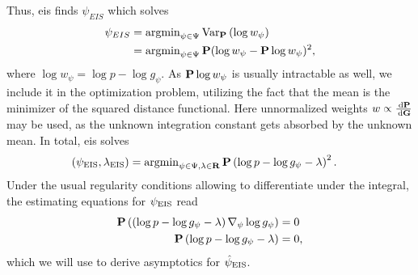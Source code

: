 Thus, \gls{eis} finds $\psi_{EIS}$ which solves 
\begin{align*}
\psi_{EIS} &= \argmin_{\psi \in\Psi} \text{Var}_{\P} \left( \log w_{\psi} \right) \\
    &= \argmin_{\psi \in \Psi} \P (\log w_{\psi} - \P \log w_{\psi})^{2},
\end{align*}
where $\log w_{\psi} = \log p - \log g_{\psi}$.
As $\P \log w_{\psi}$ is usually intractable as well, we include it in the optimization problem, utilizing the fact that the mean is the minimizer of the squared distance functional.
Here unnormalized weights $w \propto \frac{\d\P}{\d\G}$ may be used, as the unknown integration constant gets absorbed by the unknown mean. In total, \gls{eis} solves
\begin{align*}
\left(\psi_{\text{EIS}}, \lambda_{\text{EIS}}\right) &= \argmin_{\psi \in\Psi, \lambda \in \mathbf R} \P \left( \log p - \log g_{\psi} - \lambda \right)^{2}.
\end{align*}
Under the usual regularity conditions allowing to differentiate under the integral, the estimating equations for $\peis$ read
\begin{align}
    \label{eq:eis-optimal}
    \P \left(\left( \log p - \log g_{\psi} - \lambda \right) \nabla_{\psi}\log g_{\psi}\right)&=0\\
    \P \left( \log p - \log g_{\psi} - \lambda \right)&=0,
\end{align}
which we will use to derive asymptotics for $\hpeis$. 

